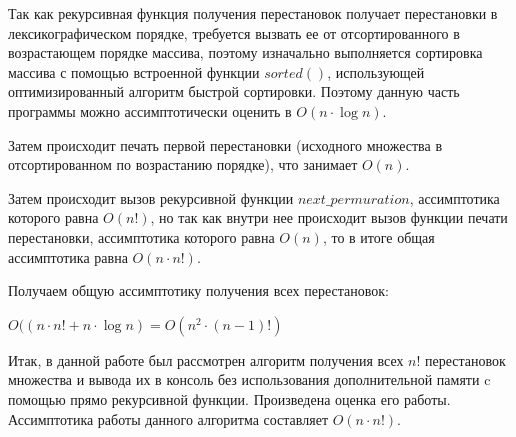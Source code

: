 \documentclass[bachelor, och, labwork]{shiza}
\begin{document}
Так как рекурсивная функция получения перестановок получает перестановки в 
лексикографическом порядке, требуется вызвать ее от отсортированного в
возрастающем порядке массива, поэтому изначально выполняется сортировка
массива с помощью встроенной функции $sorted()$, использующей оптимизированный
алгоритм быстрой сортировки. Поэтому данную часть программы можно ассимптотически
оценить в $O(n\cdot\log n )$.

Затем происходит печать первой перестановки (исходного множества в
отсортированном по возрастанию порядке), что занимает $O(n)$.

Затем происходит вызов рекурсивной функции $next\_permuration$, ассимптотика
которого равна $O(n!)$, но так как внутри нее происходит вызов функции печати
перестановки, ассимптотика которого равна $O(n)$, то в итоге общая ассимптотика
равна $O(n \cdot n!)$.


Получаем общую ассимптотику получения всех перестановок: 
\begin{center}
    $O((n \cdot n! + n \cdot \log n) = O(n^2 \cdot (n-1)!)$
\end{center} 


\conclusion

Итак, в данной работе был рассмотрен алгоритм получения всех $n!$ перестановок
множества и вывода их в консоль без использования дополнительной памяти c
помощью прямо рекурсивной функции. Произведена оценка его работы. Ассимптотика 
работы данного алгоритма составляет $O(n \cdot n!)$. 
\end{document}
